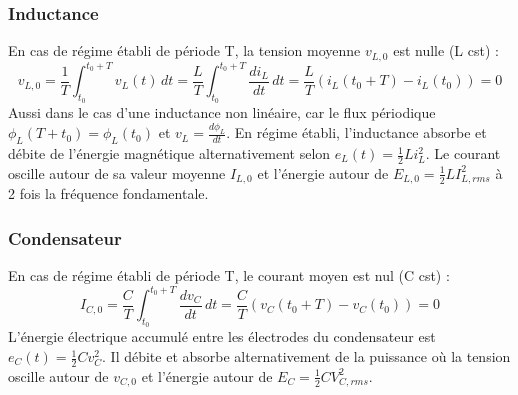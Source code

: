 		\subsubsection{Inductance}
			En cas de régime établi de période T, la tension moyenne $v_{L,0}$ est nulle (L cst) :
			\begin{equation}
				v_{L,0} = \frac{1}{T}\int _{t_0}^{t_0+T} v_L (t)\, dt = \frac{L}{T}\int _{t_0}^{t_0+T} \frac{di_L}{dt}\, dt = \frac{L}{T}\left(i_L(t_0 + T) - i_L(t_0)\right) = 0
			\end{equation}
			Aussi dans le cas d'une inductance non linéaire, car le flux périodique $\phi _L(T+t_0) = \phi _L (t_0)$ et $v_L = \frac{d\phi _L}{dt}$. En régime établi, l'inductance absorbe et débite de l'énergie magnétique alternativement selon $e_L(t) = \frac{1}{2} Li_L^2$. Le courant oscille autour de sa valeur moyenne $I_{L,0}$ et l'énergie autour de $E_{L,0}=\frac{1}{2} L I_{L,rms}^2$ à 2 fois la fréquence fondamentale. 
			
		\subsubsection{Condensateur}
			En cas de régime établi de période T, le courant moyen est nul (C cst) : 
			\begin{equation}
				I_{C,0} = \frac{C}{T}\int _{t_0}^{t_0+T} \frac{dv_C}{dt} \, dt = \frac{C}{T} (v_{C}(t_0+T)-v_C(t_0)) = 0
			\end{equation}
			L'énergie électrique accumulé entre les électrodes du condensateur est $e_C(t) = \frac{1}{2}Cv^2_C$. Il débite et absorbe alternativement de la puissance où la tension oscille autour de $v_{C,0}$ et l'énergie autour de $E_C = \frac{1}{2} C V_{C,rms}^2$.
